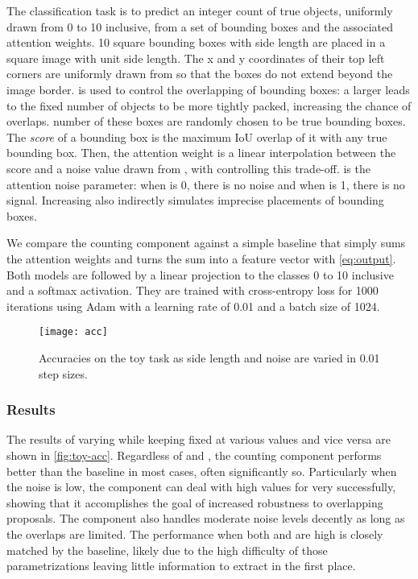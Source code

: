 \documentclass[letterpaper]{article}
\begin{document}
The classification task is to predict an integer count  of true objects, uniformly drawn from 0 to 10 inclusive, from a set of bounding boxes and the associated attention weights.
10 square bounding boxes with side length  are placed in a square image with unit side length.
The x and y coordinates of their top left corners are uniformly drawn from  so that the boxes do not extend beyond the image border.
 is used to control the overlapping of bounding boxes: a larger  leads to the fixed number of objects to be more tightly packed, increasing the chance of overlaps.
 number of these boxes are randomly chosen to be true bounding boxes.
The \emph{score} of a bounding box is the maximum IoU overlap of it with any true bounding box.
Then, the attention weight is a linear interpolation between the score and a noise value drawn from , with  controlling this trade-off.
 is the attention noise parameter: when  is 0, there is no noise and when  is 1, there is no signal.
Increasing  also indirectly simulates imprecise placements of bounding boxes.

We compare the counting component against a simple baseline that simply sums the attention weights and turns the sum into a feature vector with \autoref{eq:output}.
Both models are followed by a linear projection to the classes 0 to 10 inclusive and a softmax activation.
They are trained with cross-entropy loss for 1000 iterations using Adam \citep{Kingma2014a} with a learning rate of 0.01 and a batch size of 1024.


\begin{figure}
    \centering
    \texttt{[image: acc]}
    \caption{Accuracies on the toy task as side length  and noise  are varied in 0.01 step sizes.}
    \label{fig:toy-acc}
\end{figure}

\subsubsection{Results}
The results of varying  while keeping  fixed at various values and vice versa are shown in \autoref{fig:toy-acc}.
Regardless of  and , the counting component performs better than the baseline in most cases, often significantly so.
Particularly when the noise is low, the component can deal with high values for  very successfully, showing that it accomplishes the goal of increased robustness to overlapping proposals.
The component also handles moderate noise levels decently as long as the overlaps are limited.
The performance when both  and  are high is closely matched by the baseline, likely due to the high difficulty of those parametrizations leaving little information to extract in the first place.
\end{document}
